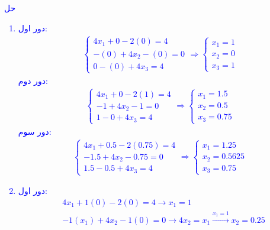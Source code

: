 \textcolor{blue}{حل
\\
\begin{enumerate}
    \item دور اول:
    \begin{align*}
        \begin{cases}
        4x_1 + 0 - 2 (0) = 4 \\
         -(0) + 4x_2 - (0) = 0 \\
        0 - (0) + 4x_3 = 4
        \end{cases}
        \Rightarrow 
        \begin{cases}
            x_1 = 1 \\
            x_2 = 0 \\
            x_3 = 1
        \end{cases}
    \end{align*}
    دور دوم:
    \begin{align*}
        \begin{cases}
            4x_1 + 0 - 2(1) = 4 \\
            -1 + 4x_2 - 1 = 0 \\
            1 - 0 + 4x_3 = 4
        \end{cases} \Rightarrow 
        \begin{cases}
            x_1 = 1.5 \\
            x_2 = 0.5 \\
            x_3 = 0.75
        \end{cases}
    \end{align*}
    دور سوم:
    \begin{align*}
        \begin{cases}
            4x_1 + 0.5 - 2(0.75) = 4 \\
            -1.5 + 4x_2 - 0.75 = 0 \\
            1.5 - 0.5 + 4x_3 = 4
        \end{cases}
        \Rightarrow \begin{cases}
            x_1 = 1.25 \\
            x_2 = 0.5625 \\
            x_3 = 0.75
        \end{cases}
    \end{align*}
    \item دور اول:
    \begin{align*}
        &4x_1 + 1 (0) - 2 (0) = 4 \rightarrow x_1 = 1 \\
        &-1 (x_1) + 4x_2 - 1(0) = 0 \rightarrow 4x_2 = x_1 \xrightarrow{x_1 = 1} x_2 = 0.25 \\

\end{align*}
\end{enumerate}}
